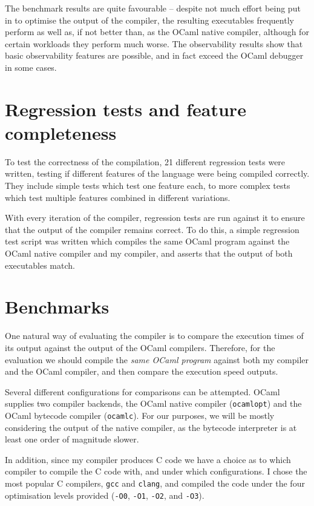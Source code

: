 The benchmark results are quite favourable -- despite not much effort being put
in to optimise the output of the compiler, the resulting executables frequently
perform as well as, if not better than, as the OCaml native compiler, although
for certain workloads they perform much worse. The observability results show
that basic observability features are possible, and in fact exceed the OCaml
debugger in some cases.

\section{Regression tests and feature completeness} \label{regression-tests}

To test the correctness of the compilation, 21 different regression tests were
written, testing if different features of the language were being compiled
correctly. They include simple tests which test one feature each, to more
complex tests which test multiple features combined in different variations.

With every iteration of the compiler, regression tests are run against it to 
ensure that the output of the compiler remains correct. To do this, a simple 
regression test script was written which compiles the same OCaml program 
against the OCaml native compiler and my compiler, and asserts that the output 
of both executables match.

\section{Benchmarks} \label{benchmarks}

One natural way of evaluating the compiler is to compare the execution times of
its output against the output of the OCaml compilers. Therefore, for the
evaluation we should compile the \emph{same OCaml program} against both my
compiler and the OCaml compiler, and then compare the execution speed outputs.

Several different configurations for comparisons can be attempted. OCaml
supplies two compiler backends, the OCaml native compiler (\texttt{ocamlopt})
and the OCaml bytecode compiler (\texttt{ocamlc}). For our purposes, we will be
mostly considering the output of the native compiler, as the bytecode
interpreter is at least one order of magnitude slower.

In addition, since my compiler produces C code we have a choice as to which
compiler to compile the C code with, and under which configurations. I chose the
most popular C compilers, \texttt{gcc} and \texttt{clang}, and compiled the code
under the four optimisation levels provided (\texttt{-O0}, \texttt{-O1},
\texttt{-O2}, and \texttt{-O3}).

